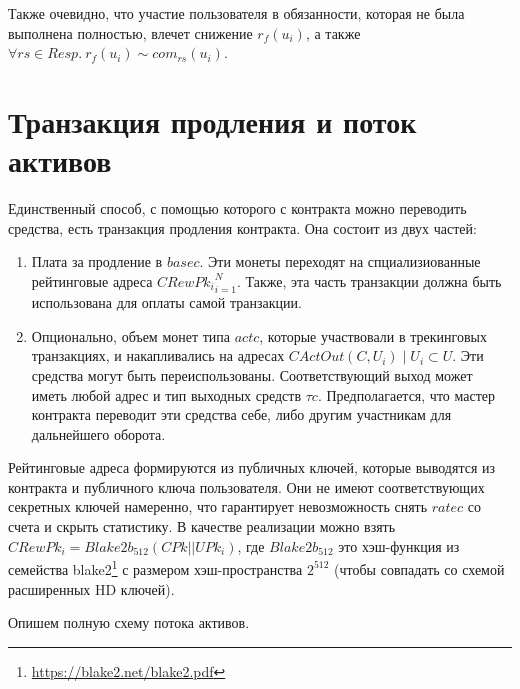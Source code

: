 \documentclass[specification,annotation]{itmo-student-thesis}
\begin{document}
Также очевидно, что участие пользователя в обязанности, которая не
была выполнена полностью, влечет снижение $r_f(u_i)$, а также $\forall
rs \in Resp . \ r_f(u_i) \sim com_{rs}(u_i)$.

\section{Транзакция продления и поток активов}

Единственный способ, с помощью которого с контракта можно переводить
средства, есть транзакция продления контракта. Она состоит из двух
частей:

\begin{enumerate}
\item Плата за продление в $basec$. Эти монеты переходят на
  спциализиованные рейтинговые адреса ${CRewPk_i}_{i=1}^N$. Также, эта часть
  транзакции должна быть использована для оплаты самой транзакции.
\item Опционально, объем монет типа $actc$, которые участвовали в
  трекинговых транзакциях, и накапливались на адресах
  $CActOut(C,U_i) \mid U_i \subset U$. Эти средства могут быть
  переиспользованы. Соответствующий выход может иметь любой адрес и
  тип выходных средств $\tau c$. Предполагается, что мастер контракта
  переводит эти средства себе, либо другим участникам для дальнейшего
  оборота.
\end{enumerate}

Рейтинговые адреса формируются из публичных ключей, которые выводятся
из контракта и публичного ключа пользователя. Они не имеют
соответствующих секретных ключей намеренно, что гарантирует
невозможность снять $ratec$ со счета и скрыть статистику. В качестве
реализации можно взять $CRewPk_i = Blake2b_{512}(CPk || UPk_i)$, где
$Blake2b_{512}$ это хэш-функция из семейства
blake2\footnote{\url{https://blake2.net/blake2.pdf}} с размером
хэш-пространства $2^{512}$ (чтобы совпадать со схемой расширенных HD
ключей).

Опишем полную схему потока активов.
\end{document}
